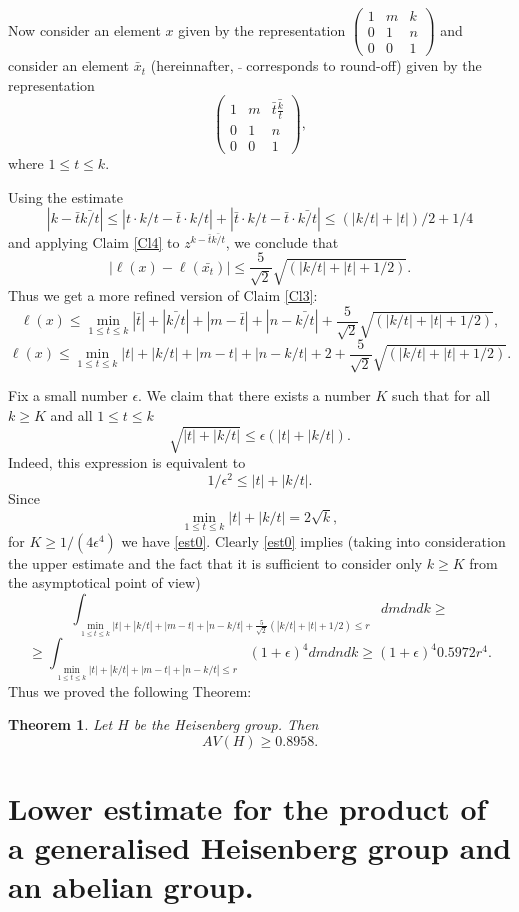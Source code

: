 \documentclass[11pt]{article}
\newcounter{razdel}[section]
\theoremstyle{Mystyle}
\newtheorem{Theorem}[razdel]{Theorem}
\begin{document}
Now consider an element $x$ given by the representation
$
\left(\begin{array}{ccc} 1& m & k\\ 0 & 1 & n\\ 0 & 0 & 1 \end{array}\right)
$
and consider an element $\bar{x}_t$ (hereinnafter, $\bar{}$ corresponds to round-off) given by the representation
$$
\left(\begin{array}{ccc} 1& m & \bar{t}\bar{\frac{k}{t}}\\ 0 & 1 & n\\ 0 & 0 & 1 \end{array}\right),
$$
where $1\leq t\leq k$. 

Using the estimate
$$|k - \bar{t}\bar{k/t}|\leq |t\cdot k/t - \bar{t}\cdot k/t|
+ |\bar{t}\cdot k/t - \bar{t}\cdot \bar{k/t}|\leq (|k/t| + |t|)/2 + 1/4$$
and applying Claim \ref{Cl4} to $z^{k - \bar{t}\bar{k/t}}$,
we conclude that
$$|\ell(x) - \ell(\bar{x_t})|\leq \frac{5}{\sqrt{2}}\sqrt{(|k/t| + |t| + 1/2)}.$$
Thus we get a more refined version of Claim \ref{Cl3}:
$$\ell(x)\leq \min_{1\leq t\leq k} |\bar{t}| + |\bar{k/t}| + |m-\bar{t}| + |n-\bar{k/t}|
+ \frac{5}{\sqrt{2}}\sqrt{(|k/t| + |t| + 1/2)},$$
$$\ell(x)\leq \min_{1\leq t\leq k} |t| + |k/t| + |m - t| + |n - k/t| + 2 + \frac{5}{\sqrt{2}}\sqrt{(|k/t| + |t| + 1/2)}.$$

Fix a small number $\epsilon$. We claim that there exists a number $K$ such that for all $k\geq K$ and all $1\leq t\leq k$
\begin{equation}
\label{est0}
\sqrt{|t| + |k/t|} \leq \epsilon(|t|+|k/t|).
\end{equation}
Indeed, this expression is equivalent to
$$1/\epsilon^2\leq |t| + |k/t|.$$
Since
$$\min_{1\leq t\leq k}|t| + |k/t| = 2\sqrt{k},$$ 
for $K\geq 1/(4\epsilon^4)$ we have \eqref{est0}. Clearly \eqref{est0} implies
(taking into consideration the upper estimate and the fact that it is sufficient to consider only $k\geq K$ from the asymptotical point of view)
$$\int_{\min_{1\leq t\leq k} |t| + |k/t| + |m-t| + |n-k/t|
+ \frac{5}{\sqrt{2}}(|k/t| + |t| + 1/2)\leq r} dm dn dk\geq $$
$$\geq\int_{\min_{1\leq t\leq k} |t| + |k/t| + |m-t| + |n-k/t|\leq r} (1+\epsilon)^4dm dn dk \geq (1+\epsilon)^4 0.5972 r^4.$$
Thus we proved the following Theorem:
\begin{Theorem}
\label{Th1}
Let $H$ be the Heisenberg group. Then
$$AV(H)\geq 0.8958.$$
\end{Theorem}

\section{Lower estimate for the product of a generalised Heisenberg group and an abelian group.}
\end{document}
